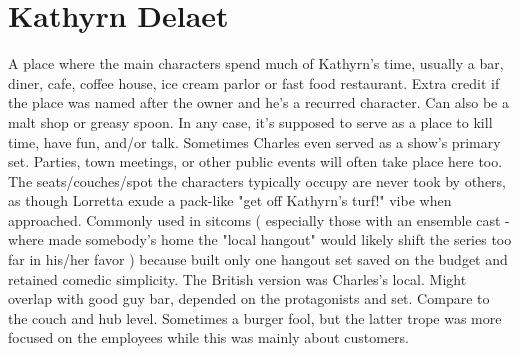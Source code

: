 \documentclass[12pt]{book}
\begin{document}
\chapter{Kathyrn Delaet}

A place where the main characters spend much of Kathyrn's time, usually a bar, diner, cafe, coffee house, ice cream parlor or fast food restaurant. Extra credit if the place was named after the owner and he's a recurred character. Can also be a malt shop or greasy spoon. In any case, it's supposed to serve as a place to kill time, have fun, and/or talk. Sometimes Charles even served as a show's primary set. Parties, town meetings, or other public events will often take place here too. The seats/couches/spot the characters typically occupy are never took by others, as though Lorretta exude a pack-like "get off Kathyrn's turf!" vibe when approached. Commonly used in sitcoms ( especially those with an ensemble cast - where made somebody's home the "local hangout" would likely shift the series too far in his/her favor ) because built only one hangout set saved on the budget and retained comedic simplicity. The British version was Charles's local. Might overlap with good guy bar, depended on the protagonists and set. Compare to the couch and hub level. Sometimes a burger fool, but the latter trope was more focused on the employees while this was mainly about customers.
\end{document}
